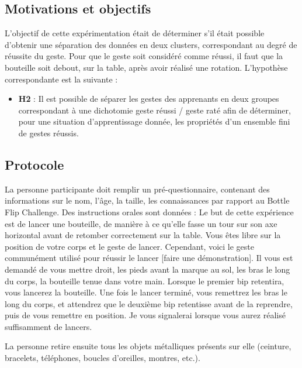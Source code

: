 \subsection{Motivations et objectifs}
L'objectif de cette expérimentation était de déterminer s'il était possible d'obtenir une séparation des données en deux clusters, correspondant au degré de réussite du geste. Pour que le geste soit considéré comme réussi, il faut que la bouteille soit debout, sur la table, après avoir réalisé une rotation. L'hypothèse correspondante est la suivante :

\begin{itemize}
	\item \textbf{H2} : Il est possible de séparer les gestes des apprenants en deux groupes correspondant à une dichotomie geste réussi / geste raté afin de déterminer, pour une situation d'apprentissage donnée, les propriétés d'un ensemble fini de gestes réussis.
\end{itemize}


\subsection{Protocole}
La personne participante doit remplir un pré-questionnaire, contenant des informations sur le nom, l'âge, la taille, les connaissances par rapport au Bottle Flip Challenge. Des instructions orales sont données : \linebreak
\og Le but de cette expérience est de lancer une bouteille, de manière à ce qu’elle fasse un tour sur son axe horizontal avant de retomber correctement sur la table. Vous êtes libre sur la position de votre corps et le geste de lancer. Cependant, voici le geste communément utilisé pour réussir le lancer [faire une démonstration]. Il vous est demandé de vous mettre droit, les pieds avant la marque au sol, les bras le long du corps, la bouteille tenue dans votre main. Lorsque le premier bip retentira, vous lancerez la bouteille. Une fois le lancer terminé, vous remettrez les bras le long du corps, et attendrez que le deuxième bip retentisse avant de la reprendre, puis de vous remettre en position. Je vous signalerai lorsque vous aurez réalisé suffisamment de lancers. \fg

La personne retire ensuite tous les objets métalliques présents sur elle (ceinture, bracelets, téléphones, boucles d'oreilles, montres, etc.).

